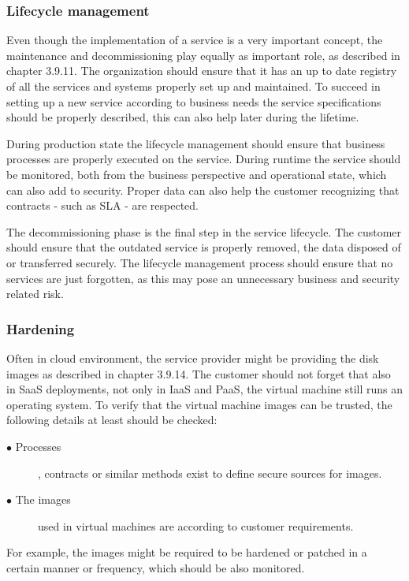 \documentclass{article}
\begin{document}
\subsubsection{Lifecycle management}
Even though the implementation of a service is a very important concept, the maintenance and decommissioning play equally as important role, as described in chapter 3.9.11. The organization should ensure that it has an up to date registry of all the services and systems properly set up and maintained. To succeed in setting up a new service according to business needs the service specifications should be properly described, this can also help later during the lifetime.
\par
During production state the lifecycle management should ensure that business processes are properly executed on the service. During runtime the service should be monitored, both from the business perspective and operational state, which can also add to security. Proper data can also help the customer recognizing that contracts - such as SLA - are respected.
\par
The decommissioning phase is the final step in the service lifecycle. The customer should ensure that the outdated service is properly removed, the data disposed of or transferred securely. The lifecycle management process should ensure that no services are just forgotten, as this may pose an unnecessary business and security related risk.

\subsubsection{Hardening}
Often in cloud environment, the service provider might be providing the disk images as described in chapter 3.9.14. The customer should not forget that also in SaaS deployments, not only in IaaS and PaaS, the virtual machine still runs an operating system. To verify that the virtual machine images can be trusted, the following details at least should be checked:
\begin{description}
	\item[$\bullet$ Processes], contracts or similar methods exist to define secure sources for images.
	\item[$\bullet$ The images] used in virtual machines are according to customer requirements.
\end{description}
For example, the images might be required to be hardened or patched in a certain manner or frequency, which should be also monitored.
\end{document}
